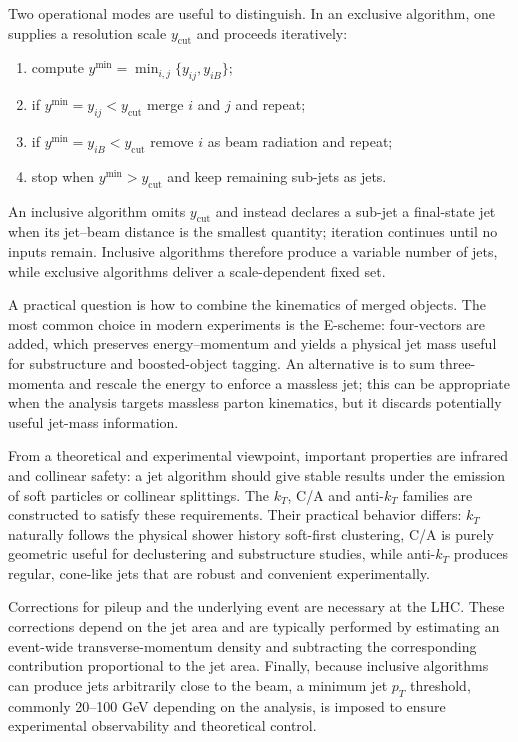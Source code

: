 Two operational modes are useful to distinguish. In an exclusive algorithm, one supplies a resolution scale $y_{\text{cut}}$ and proceeds iteratively:
\begin{enumerate}
  \item compute $y^{\min}=\min_{i,j}\{y_{ij},y_{iB}\}$;
  \item if $y^{\min}=y_{ij}<y_{\text{cut}}$ merge $i$ and $j$ and repeat;
  \item if $y^{\min}=y_{iB}<y_{\text{cut}}$ remove $i$ as beam radiation and repeat;
  \item stop when $y^{\min}>y_{\text{cut}}$ and keep remaining sub-jets as jets.
\end{enumerate}
An inclusive algorithm omits $y_{\text{cut}}$ and instead declares a sub-jet a final-state jet when its jet–beam distance is the smallest quantity; iteration continues until no inputs remain. Inclusive algorithms therefore produce a variable number of jets, while exclusive algorithms deliver a scale-dependent fixed set.

A practical question is how to combine the kinematics of merged objects. The most common choice in modern experiments is the E-scheme: four-vectors are added, which preserves energy–momentum and yields a physical jet mass useful for substructure and boosted-object tagging. An alternative is to sum three-momenta and rescale the energy to enforce a massless jet; this can be appropriate when the analysis targets massless parton kinematics, but it discards potentially useful jet-mass information.

From a theoretical and experimental viewpoint, important properties are infrared and collinear safety: a jet algorithm should give stable results under the emission of soft particles or collinear splittings. The $k_T$, C/A and anti-$k_T$ families are constructed to satisfy these requirements. Their practical behavior differs: $k_T$ naturally follows the physical shower history soft-first clustering, C/A is purely geometric useful for declustering and substructure studies, while anti-$k_T$ produces regular, cone-like jets that are robust and convenient experimentally.

Corrections for pileup and the underlying event are necessary at the LHC. These corrections depend on the jet area and are typically performed by estimating an event-wide transverse-momentum density and subtracting the corresponding contribution proportional to the jet area. Finally, because inclusive algorithms can produce jets arbitrarily close to the beam, a minimum jet $p_T$ threshold, commonly 20–100 GeV depending on the analysis, is imposed to ensure experimental observability and theoretical control.

